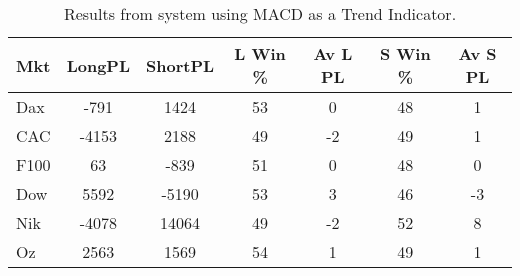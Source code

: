\begin{table}[ht]
\centering
\caption[Results from system using MACD as a Trend Indicator]{Results from system using MACD as a Trend Indicator.} 
\label{tab:mac_trend_results}
\begin{tabular}{lcccccc}
  \toprule Mkt & LongPL & ShortPL & L Win \% & Av L PL & S Win \% & Av S PL \\ 
  \midrule Dax & -791 & 1424 & 53 & 0 & 48 & 1 \\ 
  CAC & -4153 & 2188 & 49 & -2 & 49 & 1 \\ 
  F100 & 63 & -839 & 51 & 0 & 48 & 0 \\ 
  Dow & 5592 & -5190 & 53 & 3 & 46 & -3 \\ 
  Nik & -4078 & 14064 & 49 & -2 & 52 & 8 \\ 
  Oz & 2563 & 1569 & 54 & 1 & 49 & 1 \\ 
   \bottomrule \end{tabular}
\end{table}
